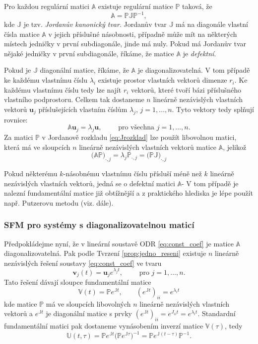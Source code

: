 \documentclass[a4paper, 12pt]{book}
\theoremstyle{definition}
\def\vc#1{\mathbf{\boldsymbol{#1}}}     %
\def\tn#1{{\mathbb{#1}}}    %
\def\df#1{\emph{#1}}
\begin{document}
Pro každou regulární matici $\tn A$ existuje regulární matice $\tn P$ taková, že
\begin{equation}
   \label{eq:Jrozklad}
   \tn A = \tn P \tn J \tn P^{-1},
\end{equation}
kde $\tn J$ je tzv. \df{Jordanův kanonický tvar}. Jordanův tvar $\tn J$ 
má na diagonále vlastní čísla matice $\tn A$ v jejich příslušné násobnosti, případně může mít na některých místech jedničky v první subdiagonále, jinde má nuly.
Pokud má Jordanův tvar nějaké jedničky v první subdiagonále, říkáme, že matice $\tn A$ je \df{defektní}. 

Pokud je $\tn J$ diagonální matice, říkáme, že $\tn A$ je diagonalizovatelná. V tom případě ke každému vlastnímu číslu $\lambda_i$ existuje prostor vlastních vektorů dimenze $r_i$.
Ke každému vlastnímu číslu tedy lze najít $r_i$ vektorů, které tvoří bázi příslušného 
vlastního podprostoru. Celkem tak dostaneme $n$ lineárně nezávislých vlastních vektorů
$\vc u_j$ příslušejících vlastním číslům $\lambda_j$, $j=1,\dots, n$. Tyto vektory tedy splňují rovnice:
\[
   \tn A \vc u_j = \lambda_j \vc u, \qquad \text{ pro všechna } j=1,\dots, n.
\]
Za matici $\tn P$ v Jordanově rozkladu \eqref{eq:Jrozklad} lze použít libovolnou matici, která má ve sloupcích $n$ lineárně nezávislých vlastních vektorů matice $\tn A$, jelikož
\[
    \big( \tn A \tn P \big)_{\cdot, j} = \lambda_j \tn P_{\cdot, j} = \big(\tn P \tn J\big)_{\cdot, j}
\]    

Pokud některému $k$-násobnému vlastnímu číslu přísluší méně než $k$ lineárně nezávislých vlastních vektorů, jedná se o defektní matici $\tn A$- V tom případě 
je nalezní fundamentální matice již obtížnější a z praktického hlediska je lépe použít např. Putzerovu metodu (viz. dále).

\subsubsection{SFM pro systémy s diagonalizovatelnou maticí}
Předpokládejme nyní, že v lineární soustavě ODR \eqref{eq:const_coef} je matice $\tn A$ diagonalizovatelná.
Pak podle Tvrzení \eqref{prop:jedno_reseni}
existuje $n$ lineárně nezávislých řešení soustavy \eqref{eq:const_coef} ve tvaru 
\[
    \vc v_j(t)= \vc u_j e^{\lambda_j t},\qquad \text{ pro } j=1,\dots, n.
\]
Tato řešení dávají sloupce fundamentální matice
\[
    \tn V(t) = \tn P e^{\tn J t},\qquad (e^{\tn Jt})_{ii} = e^{\lambda_i t}
\]
kde matice $\tn P$ má ve sloupcích libovolných $n$ lineárně nezávislých vlastních vektorů
a $e^{\tn Jt}$ je diagonální matice s prvky $(e^{\tn Jt})_{ii} = e^{J_{ii} t} = e^{\lambda_i t}$. 
Standardní fundamentální matici pak dostaneme vynásobením inverzí matice $\tn V(\tau)$, tedy
\[
  \tn U(t, \tau) = \tn P e^{\tn J t} \big(\tn P e^{\tn J \tau} \big)^{-1} = \tn P e^{\tn J(t-\tau)} \tn P^{-1}.
\]
\end{document}
